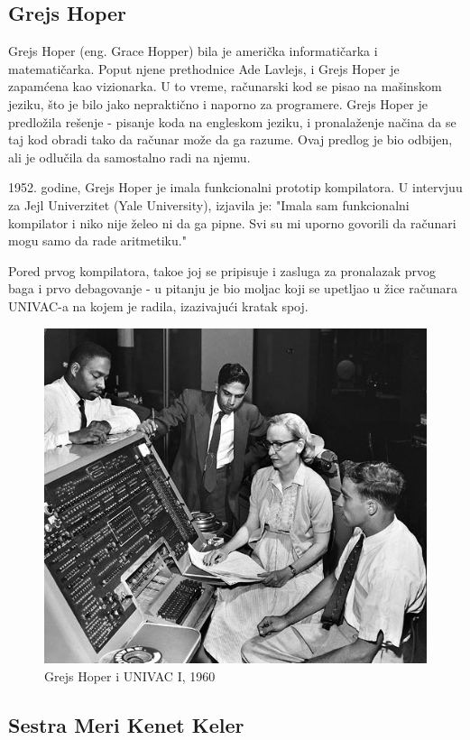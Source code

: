 \documentclass[12pt]{article}
\begin{document}
\subsection{Grejs Hoper}
\begin{text}
Grejs Hoper (eng. Grace Hopper) bila je američka informatičarka i matematičarka. Poput njene prethodnice Ade Lavlejs, i Grejs Hoper je zapamćena kao vizionarka. U to vreme, računarski kod se pisao na mašinskom jeziku, što je bilo jako nepraktično i naporno za programere. Grejs Hoper je predložila rešenje - pisanje koda na engleskom jeziku, i pronalaženje načina da se taj kod obradi tako da računar može da ga razume. Ovaj predlog je bio odbijen, ali je odlučila da samostalno radi na njemu.

1952. godine, Grejs Hoper je imala funkcionalni prototip kompilatora. U intervjuu za Jejl Univerzitet (Yale University), izjavila je: "Imala sam funkcionalni kompilator i niko nije želeo ni da ga pipne. Svi su mi uporno govorili da računari mogu samo da rade aritmetiku."

Pored prvog kompilatora, tako\dj e joj se pripisuje i zasluga za pronalazak prvog baga i prvo debagovanje - u pitanju je bio moljac koji se upetljao u žice računara UNIVAC-a na kojem je radila, izazivajući kratak spoj. 

\begin{figure}[htp]
    \centering
    \includegraphics[width=0.8\linewidth]{gracehopper.png}
    \caption{Grejs Hoper i UNIVAC I, 1960}
\end{figure}

\end{text}

\subsection{Sestra Meri Kenet Keler}
\end{document}
